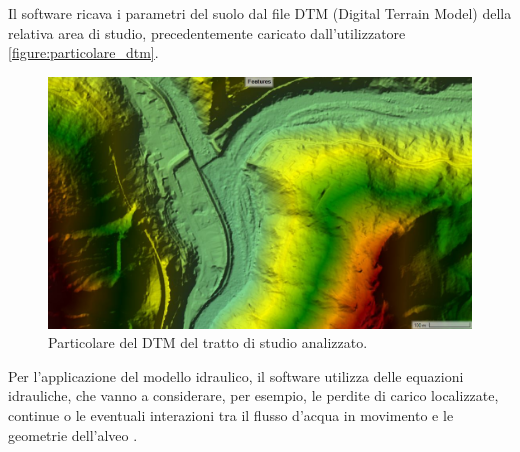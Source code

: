 Il software ricava i parametri del suolo dal file DTM (Digital Terrain Model) della relativa area di studio, precedentemente caricato dall'utilizzatore \eqref{figure:particolare_dtm}.

\begin{figure}[H] \centering
    \includegraphics[scale=0.3]{immagini/particolare_dtm.JPG}
    \caption{Particolare del DTM del tratto di studio analizzato.}
    \label{figure:particolare_dtm}
\end{figure}

Per l'applicazione del modello idraulico, il software utilizza delle equazioni idrauliche, che vanno a considerare, per esempio, le perdite di carico localizzate, continue o le eventuali interazioni tra il flusso d'acqua in movimento e le geometrie dell'alveo \cite{hydraulic_equations}.

